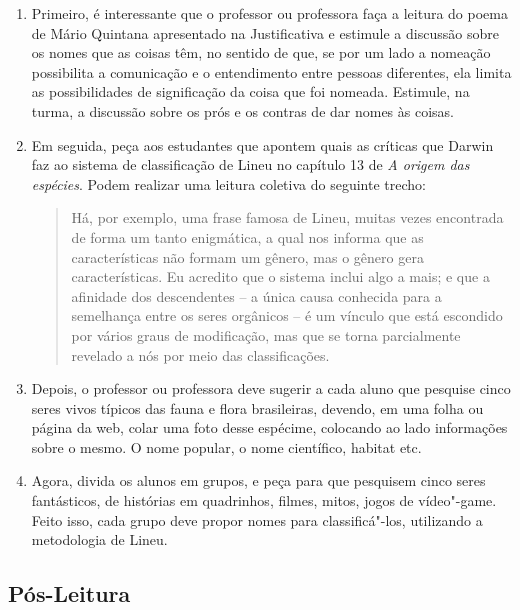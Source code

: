\documentclass[11pt]{extarticle}
\begin{document}
\begin{enumerate}

	\item
	Primeiro, é interessante que o professor ou professora faça a leitura do poema
	de Mário Quintana apresentado na Justificativa e estimule a discussão
	sobre os nomes que as coisas têm, no sentido de que, se por um lado
	a nomeação possibilita a comunicação e o entendimento entre pessoas
	diferentes, ela limita as possibilidades de significação da coisa que foi nomeada.
	Estimule, na turma, a discussão sobre os prós e os contras de dar nomes
	às coisas.

	\item
	Em seguida, peça aos estudantes que apontem quais as críticas que Darwin faz ao sistema
	de classificação de Lineu no capítulo 13 de \emph{A origem das espécies}.
	Podem realizar uma leitura coletiva do seguinte trecho:

	\begin{quote}
	 Há, por exemplo, uma frase famosa de Lineu, muitas vezes encontrada de forma um tanto enigmática, a qual nos informa que as características não formam um gênero, mas o gênero gera características. Eu acredito que o sistema inclui algo a mais; e que a afinidade dos descendentes -- a única causa conhecida para a semelhança entre os seres orgânicos -- é um vínculo que está escondido por vários graus de modificação, mas que se torna parcialmente revelado a nós por meio das classificações.
	\end{quote}

	\item
	Depois, o professor ou professora deve sugerir a cada aluno que pesquise cinco 
	seres vivos típicos das fauna e flora brasileiras, devendo, em uma folha ou 
	página da web, colar uma foto desse espécime, colocando ao lado informações sobre o 
	mesmo. O nome popular, o nome científico, habitat etc.

	\item
	Agora, divida os alunos em grupos, e peça para que pesquisem cinco
	seres fantásticos, de histórias em quadrinhos, filmes, mitos, jogos de
	vídeo"-game. Feito isso, cada grupo deve propor nomes para classificá"-los,
	utilizando a metodologia de Lineu.

\end{enumerate}


\subsection{Pós-Leitura}
\end{document}
